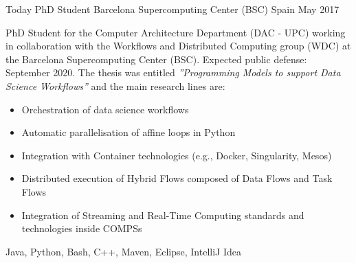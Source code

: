 %
%
%


\begin{experiences}
    \experience
        {Today}
        {PhD Student}
        {Barcelona Supercomputing Center (BSC)}
        {Spain}
        {May 2017}
        {PhD Student for the Computer Architecture Department (DAC - UPC) working in collaboration with the Workflows and Distributed Computing group (WDC) at the Barcelona Supercomputing Center (BSC). Expected public defense: September 2020. The thesis was entitled \textit{''Programming Models to support Data Science Workflows''} and the main research lines are:
        \begin{itemize}
            \item Orchestration of data science workflows
            \item Automatic parallelisation of affine loops in Python
            \item Integration with Container technologies (e.g., Docker, Singularity, Mesos)
            \item Distributed execution of Hybrid Flows composed of Data Flows and Task Flows
            \item Integration of Streaming and Real-Time Computing standards and technologies inside COMPSs
        \end{itemize}
        }
        {Java, Python, Bash, C++, Maven, Eclipse, IntelliJ Idea}

\end{experiences}
